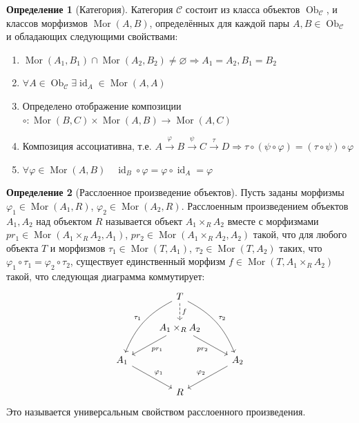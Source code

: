 \documentclass{article}
\theoremstyle{definition}
\newtheorem*{definition}{Определение}
\theoremstyle{remark}
\DeclareMathOperator{\id}{id}
\DeclareMathOperator{\Mor}{Mor}
\DeclareMathOperator{\Ob}{Ob}
\newcommand{\Ra}{\Rightarrow}
\newcommand{\inter}{\cap}
\begin{document}
\begin{definition}[Категория]
    Категория $\mathcal{C}$ состоит из класса объектов $\Ob_{\mathcal{C}}$, и классов морфизмов $\Mor(A, B)$, определённых для каждой пары $A, B \in \Ob_{\mathcal{C}}$ и обладающих следующими свойствами:
    \begin{enumerate}
        \item $\Mor (A_1, B_1) \inter \Mor(A_2, B_2) \neq \varnothing \Ra A_1 = A_2, B_1 = B_2$
        \item $\forall A \in \Ob_{\mathcal{C}} \exists \id_A \in \Mor(A, A)$
        \item Определено отображение композиции $\circ : \Mor(B, C) \times \Mor(A, B) \to \Mor(A, C)$
        \item Композиция ассоциативна, т.е. $A \xrightarrow{\varphi} B \xrightarrow{\psi} C \xrightarrow{\tau} D \Ra \tau \circ (\psi \circ \varphi) = (\tau \circ \psi) \circ \varphi$
        \item $\forall \varphi \in \Mor(A, B) \quad \id_B \circ \varphi = \varphi \circ \id_A = \varphi$
    \end{enumerate}
\end{definition}

\begin{definition}[Расслоенное произведение объектов]
    Пусть заданы морфизмы $\varphi_1 \in \Mor(A_1, R)$, $\varphi_2 \in \Mor(A_2, R)$. Расслоенным произведением объектов $A_1, A_2$ над объектом $R$ называется объект $A_1 \times_R A_2$ вместе с морфизмами $pr_1 \in \Mor(A_1 \times_R A_2, A_1)$, $pr_2 \in \Mor(A_1 \times_R A_2, A_2)$ такой, что для любого объекта $T$ и морфизмов $\tau_1 \in \Mor(T, A_1)$, $\tau_2 \in \Mor(T, A_2)$ таких, что $\varphi_1 \circ \tau_1 = \varphi_2 \circ \tau_2$, существует единственный морфизм $f \in \Mor(T, A_1 \times_R A_2)$ такой, что следующая диаграмма коммутирует:
    \begin{equation*}
    \begin{tikzcd}
        & T \ar[dashed]{d}{f} \ar[bend right=20, swap]{ddl}{\tau_1} \ar[bend left=20]{ddr}{\tau_2} & \\
        & A_1 \times_R A_2 \ar{dl}{pr_1} \ar[swap]{dr}{pr_2} & \\
        A_1 \ar{dr}{\varphi_1} & & A_2 \ar[swap]{dl}{\varphi_2} \\
        & R &
    \end{tikzcd}
    \end{equation*}
    Это называется универсальным свойством расслоенного произведения.
\end{definition}
\end{document}
